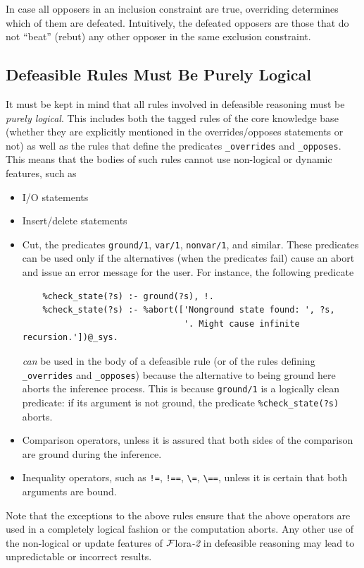 \documentclass[11pt]{article}
\newcommand{\FLORA}{{\mbox{\sc ${\cal F}${lora}\rm\emph{-2}}}\xspace}
\begin{document}
In case all opposers in an inclusion constraint are true, overriding
determines which of them are defeated.  Intuitively, the defeated opposers
are those that do not ``beat'' (rebut) any other opposer in the same
exclusion constraint.



\subsection{Defeasible Rules Must Be Purely Logical}

It must be kept in mind that all rules involved in defeasible reasoning
must be \emph{purely logical}. This includes both the tagged rules of the
core knowledge base (whether they are explicitly mentioned in the
overrides/opposes statements or not) as well as the rules that define the
predicates {\tt \_overrides} and {\tt \_opposes}.  This means that the
bodies of such rules cannot use non-logical or dynamic features, such as
\begin{itemize}
\item  I/O statements
\item  Insert/delete statements
\item  Cut, the predicates {\tt ground/1}, {\tt var/1}, {\tt nonvar/1}, and
  similar.
  These predicates can be used only if the alternatives (when
  the predicates fail) cause an abort and issue an error message for the user.
  For instance, the following predicate
\begin{verbatim}
    %check_state(?s) :- ground(?s), !.
    %check_state(?s) :- %abort(['Nonground state found: ', ?s,
                                '. Might cause infinite recursion.'])@_sys.  
\end{verbatim}
  \emph{can} be used in the body of a defeasible rule (or of the rules defining
  {\tt \_overrides} and {\tt \_opposes}) because the alternative to being
  ground here aborts the inference process.
  This is because \texttt{ground/1} is a logically clean predicate: if its
  argument is not ground, the predicate \texttt{\%check\_state(?s)} aborts.  
\item  Comparison operators, unless it is assured that both sides of the
  comparison are ground during the inference.
\item  Inequality operators, such as {\tt !=}, {\tt !==}, \verb|\=|,
  \verb|\==|,  unless it is certain that both arguments are bound.
\end{itemize}
Note that the exceptions to the above rules ensure that the above operators
are used in a completely logical fashion or the computation aborts. Any
other use of the non-logical or update features of \FLORA in defeasible
reasoning may lead to unpredictable or incorrect results.
\end{document}
